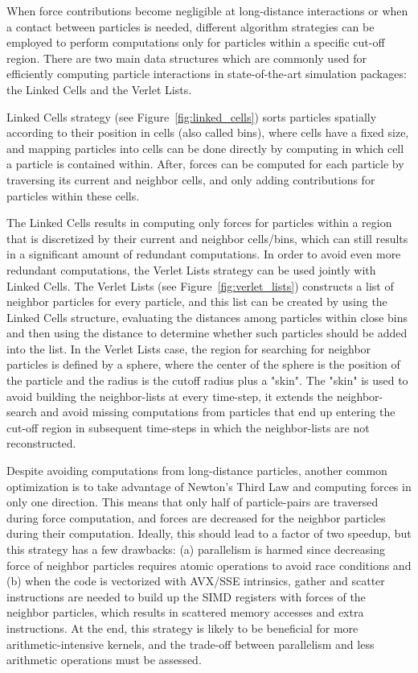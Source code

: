 \documentclass[preprint,12pt]{elsarticle}
\begin{document}
When force contributions become negligible at long-distance interactions or when a contact between particles is needed, different algorithm strategies can be employed to perform computations only for particles within a specific cut-off region.
There are two main data structures which are commonly used for efficiently computing particle interactions in state-of-the-art simulation packages: the Linked Cells and the Verlet Lists.

Linked Cells strategy (see Figure~\ref{fig:linked_cells}) sorts particles spatially according to their position in cells (also called bins), where cells have a fixed size, and mapping particles into cells can be done directly by computing in which cell a particle is contained within.
After, forces can be computed for each particle by traversing its current and neighbor cells, and only adding contributions for particles within these cells.

The Linked Cells results in computing only forces for particles within a region that is discretized by their current and neighbor cells/bins, which can still results in a significant amount of redundant computations.
In order to avoid even more redundant computations, the Verlet Lists strategy can be used jointly with Linked Cells.
The Verlet Lists (see Figure~\ref{fig:verlet_lists}) constructs a list of neighbor particles for every particle, and this list can be created by using the Linked Cells structure, evaluating the distances among particles within close bins and then using the distance to determine whether such particles should be added into the list.
In the Verlet Lists case, the region for searching for neighbor particles is defined by a sphere, where the center of the sphere is the position of the particle and the radius is the cutoff radius plus a "skin".
The "skin" is used to avoid building the neighbor-lists at every time-step, it extends the neighbor-search and avoid missing computations from particles that end up entering the cut-off region in subsequent time-steps in which the neighbor-lists are not reconstructed.

Despite avoiding computations from long-distance particles, another common optimization is to take advantage of Newton's Third Law and computing forces in only one direction.
This means that only half of particle-pairs are traversed during force computation, and forces are decreased for the neighbor particles during their computation.
Ideally, this should lead to a factor of two speedup, but this strategy has a few drawbacks: (a) parallelism is harmed since decreasing force of neighbor particles requires atomic operations to avoid race conditions and (b) when the code is vectorized with AVX/SSE intrinsics, gather and scatter instructions are needed to build up the SIMD registers with forces of the neighbor particles, which results in scattered memory accesses and extra instructions.
At the end, this strategy is likely to be beneficial for more arithmetic-intensive kernels, and the trade-off between parallelism and less arithmetic operations must be assessed.
\end{document}
